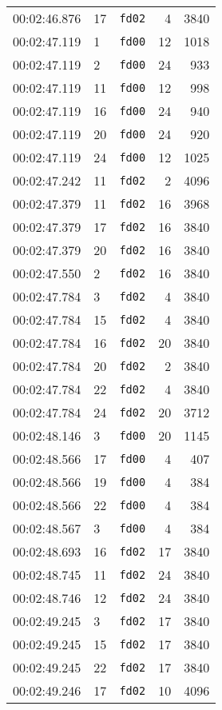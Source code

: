 \documentclass{article}
\begin{document}
\begin{longtable}{lllrr}
00:02:46.876 & 17 & \texttt{fd02} & 4 & 3840 \\
00:02:47.119 & 1 & \texttt{fd00} & 12 & 1018 \\
00:02:47.119 & 2 & \texttt{fd00} & 24 & 933 \\
00:02:47.119 & 11 & \texttt{fd00} & 12 & 998 \\
00:02:47.119 & 16 & \texttt{fd00} & 24 & 940 \\
00:02:47.119 & 20 & \texttt{fd00} & 24 & 920 \\
00:02:47.119 & 24 & \texttt{fd00} & 12 & 1025 \\
00:02:47.242 & 11 & \texttt{fd02} & 2 & 4096 \\
00:02:47.379 & 11 & \texttt{fd02} & 16 & 3968 \\
00:02:47.379 & 17 & \texttt{fd02} & 16 & 3840 \\
00:02:47.379 & 20 & \texttt{fd02} & 16 & 3840 \\
00:02:47.550 & 2 & \texttt{fd02} & 16 & 3840 \\
00:02:47.784 & 3 & \texttt{fd02} & 4 & 3840 \\
00:02:47.784 & 15 & \texttt{fd02} & 4 & 3840 \\
00:02:47.784 & 16 & \texttt{fd02} & 20 & 3840 \\
00:02:47.784 & 20 & \texttt{fd02} & 2 & 3840 \\
00:02:47.784 & 22 & \texttt{fd02} & 4 & 3840 \\
00:02:47.784 & 24 & \texttt{fd02} & 20 & 3712 \\
00:02:48.146 & 3 & \texttt{fd00} & 20 & 1145 \\
00:02:48.566 & 17 & \texttt{fd00} & 4 & 407 \\
00:02:48.566 & 19 & \texttt{fd00} & 4 & 384 \\
00:02:48.566 & 22 & \texttt{fd00} & 4 & 384 \\
00:02:48.567 & 3 & \texttt{fd00} & 4 & 384 \\
00:02:48.693 & 16 & \texttt{fd02} & 17 & 3840 \\
00:02:48.745 & 11 & \texttt{fd02} & 24 & 3840 \\
00:02:48.746 & 12 & \texttt{fd02} & 24 & 3840 \\
00:02:49.245 & 3 & \texttt{fd02} & 17 & 3840 \\
00:02:49.245 & 15 & \texttt{fd02} & 17 & 3840 \\
00:02:49.245 & 22 & \texttt{fd02} & 17 & 3840 \\
00:02:49.246 & 17 & \texttt{fd02} & 10 & 4096 \\

\end{longtable}
\end{document}
